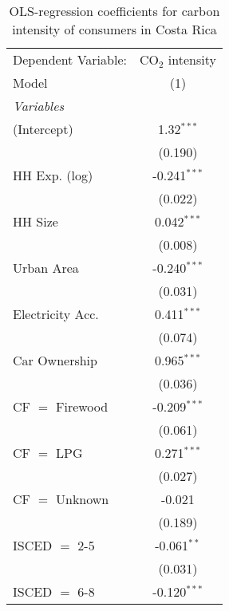 
\begin{table}[htbp!]
   \centering
   \small
   \begin{adjustbox}{width = 1\textwidth, max height = 0.95\textheight, center}
      \begin{threeparttable}[b]
         \caption{\label{tab:OLS_1_CRI} OLS-regression coefficients for carbon intensity of consumers in Costa Rica}
         \begin{tabular}{lc}
            \tabularnewline \midrule \midrule
            Dependent Variable: & CO$_{2}$ intensity\\  
            Model               & (1)\\  
            \midrule
            \emph{Variables}\\
            (Intercept)         & 1.32$^{***}$\\   
                                & (0.190)\\   
            HH Exp. (log)       & -0.241$^{***}$\\   
                                & (0.022)\\   
            HH Size             & 0.042$^{***}$\\   
                                & (0.008)\\   
            Urban Area          & -0.240$^{***}$\\   
                                & (0.031)\\   
            Electricity Acc.    & 0.411$^{***}$\\   
                                & (0.074)\\   
            Car Ownership       & 0.965$^{***}$\\   
                                & (0.036)\\   
            CF $=$ Firewood     & -0.209$^{***}$\\   
                                & (0.061)\\   
            CF $=$ LPG          & 0.271$^{***}$\\   
                                & (0.027)\\   
            CF $=$ Unknown      & -0.021\\   
                                & (0.189)\\   
            ISCED $=$ 2-5       & -0.061$^{**}$\\   
                                & (0.031)\\   
            ISCED $=$ 6-8       & -0.120$^{***}$\\   

\end{tabular}
\end{threeparttable}
\end{adjustbox}
\end{table}
